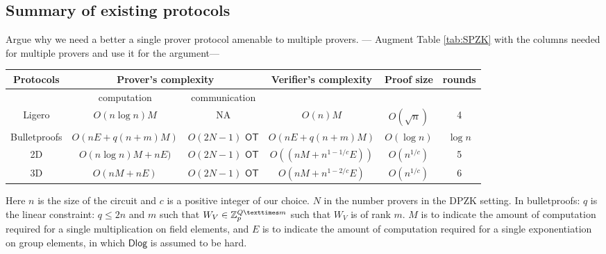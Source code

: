 \subsection{Summary of existing protocols}
Argue why we need a better a single prover protocol amenable to multiple provers. 
--- Augment Table \ref{tab:SPZK} with the columns needed for multiple provers and use it for the argument--- 
\begin{center}
	\begin{tabular}{ |c|c|c|c|c|c| } 
		\hline
		Protocols & \multicolumn{2}{c|}{Prover's complexity} & Verifier's complexity & Proof size & rounds \\
		\hline
		&computation & communication& & & \\ 
		\hline
		Ligero & $O(n\log n)M$ & NA &$O(n)M$ & $O(\sqrt{n})$ & 4\\
		\hline
		Bulletproofs & $O(nE+q(n+m)M)$ & $O(2N-1)$ $\mathsf{OT}$& $O(nE+q(n+m)M)$ & $O(\log n)$ & $\log n$  \\
		\hline
		\name2D & $O(n \log n) M + nE)$ & $O(2N-1)$ $\mathsf{OT}$ & $O((nM + n^{1-1/c}E))$ & $O(n^{1/c})$ & 5 \\
		\hline
		\name3D & $O(nM+nE)$ & $O(2N-1)$ $\mathsf{OT}$ & $O(nM+n^{1-2/c}E)$& $O(n^{1/c})$ & $6$\\
		\hline
	\end{tabular}
\end{center}
Here $n$ is the size of the circuit and $c$ is a positive integer of our choice. $N$ in the number provers in the DPZK setting. 
In bulletproofs: $q$ is the linear constraint: $q\leq 2n$ and $m$ such that $W_V \in \bbZ_p^{Q×m}$  such that $W_V$ is of rank $m$.
$M$ is to indicate the amount of computation required for a single multiplication on field elements, and $E$ is to indicate the amount of computation required for a single exponentiation on group elements, in which $\mathsf{Dlog}$ is assumed to be hard.

